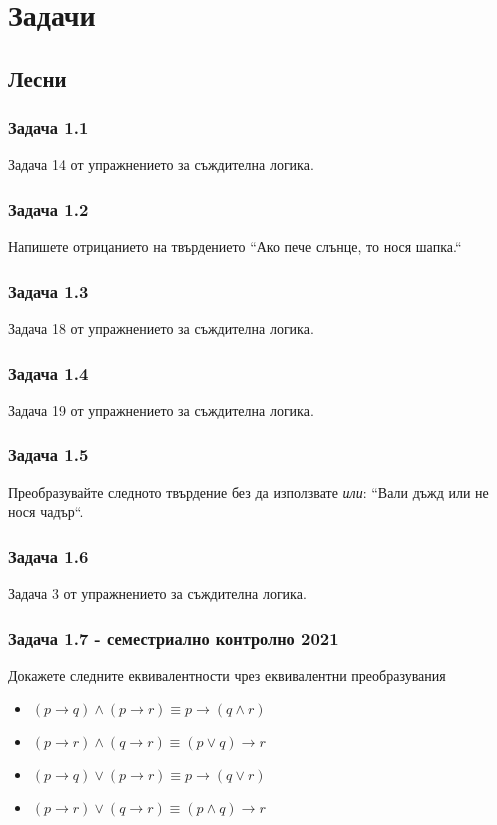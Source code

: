 \documentclass[12pt]{article}
\begin{document}
\section*{Задачи}

\subsection*{Лесни}
\subsubsection*{Задача 1.1}
Задача 14 от упражнението за съждителна логика.
\subsubsection*{Задача 1.2}
Напишете отрицанието на твърдението ``Ако пече слънце, то нося шапка.``
\subsubsection*{Задача 1.3}
Задача 18 от упражнението за съждителна логика.
\subsubsection*{Задача 1.4}
Задача 19 от упражнението за съждителна логика.
\subsubsection*{Задача 1.5}
Преобразувайте следното твърдение без да използвате \emph{или}: ``Вали дъжд или не нося чадър``.
\subsubsection*{Задача 1.6}
Задача 3 от упражнението за съждителна логика.
\subsubsection*{Задача 1.7 - семестриално контролно 2021}
Докажете следните еквивалентности чрез еквивалентни преобразувания
\begin{itemize}
    \item $(p \rightarrow q) \land (p \rightarrow r) \equiv p \rightarrow (q \land r)$
    \item $(p \rightarrow r) \land (q \rightarrow r) \equiv (p \lor q) \rightarrow r$
    \item $(p \rightarrow q) \lor (p \rightarrow r) \equiv p \rightarrow (q \lor r)$
    \item $(p \rightarrow r) \lor (q \rightarrow r) \equiv (p \land q) \rightarrow r$
\end{itemize}
\end{document}
